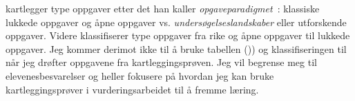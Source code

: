 \documentclass[main.tex]{subfiles}
\begin{document}
 kartlegger type oppgaver etter det han kaller 
\mbox{\emph{opgaveparadigmet} :}
klassiske lukkede oppgaver og åpne oppgaver 
vs. \emph{undersøgelseslandskaber} eller utforskende oppgaver. 
Videre klassifiserer  type oppgaver fra rike og åpne oppgaver 
til lukkede oppgaver. Jeg kommer derimot ikke til å bruke tabellen ()) og klassifiseringen til 
 når jeg drøfter oppgavene fra kartleggingsprøven. Jeg vil begrense meg til elevenesbesvarelser 
og heller fokusere på hvordan jeg kan bruke kartleggingsprøver i vurderingsarbeidet til å fremme læring.

\end{document}
